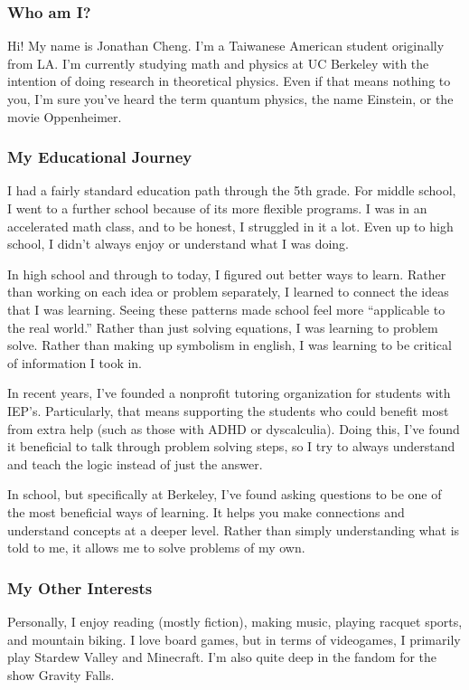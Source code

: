 \documentclass{notes}
\begin{document}
\subsubsection*{Who am I?}
\tab Hi! My name is Jonathan Cheng. I'm a Taiwanese American student originally from LA. I'm currently studying math and physics at UC Berkeley with the intention of doing research in theoretical physics. Even if that means nothing to you, I'm sure you've heard the term quantum physics, the name Einstein, or the movie Oppenheimer.

\subsubsection*{My Educational Journey}
\tab I had a fairly standard education path through the 5th grade. For middle school, I went to a further school because of its more flexible programs. I was in an accelerated math class, and to be honest, I struggled in it a lot. Even up to high school, I didn't always enjoy or understand what I was doing.

\tab In high school and through to today, I figured out better ways to learn. Rather than working on each idea or problem separately, I learned to connect the ideas that I was learning. Seeing these patterns made school feel more ``applicable to the real world.'' Rather than just solving equations, I was learning to problem solve. Rather than making up symbolism in english, I was learning to be critical of information I took in.

\tab In recent years, I've founded a nonprofit tutoring organization for students with IEP's. Particularly, that means supporting the students who could benefit most from extra help (such as those with ADHD or dyscalculia). Doing this, I've found it beneficial to talk through problem solving steps, so I try to always understand and teach the logic instead of just the answer.

\tab In school, but specifically at Berkeley, I've found asking questions to be one of the most beneficial ways of learning. It helps you make connections and understand concepts at a deeper level. Rather than simply understanding what is told to me, it allows me to solve problems of my own.

\subsubsection*{My Other Interests}
\tab Personally, I enjoy reading (mostly fiction), making music, playing racquet sports, and mountain biking. I love board games, but in terms of videogames, I primarily play Stardew Valley and Minecraft. I'm also quite deep in the fandom for the show Gravity Falls.
\end{document}
